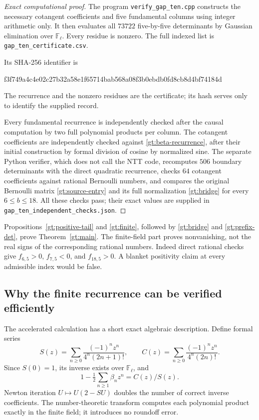 \begin{proof}[Exact computational proof]
The program \texttt{verify\_gap\_ten.cpp} constructs the necessary
cotangent coefficients and five fundamental columns using integer
arithmetic only. It then evaluates all $73722$ five-by-five
determinants by Gaussian elimination over $\mathbb F_\ell$.
Every residue is nonzero. The full indexed list is
\texttt{gap\_ten\_certificate.csv}.
\begin{samepage}
\noindent Its SHA-256 identifier is
\begin{center}\small\ttfamily
f3f749a4c4e02c27b32a58e1f65714bab568a08f3b0ebdb0fd8cb8d4bf74184d
\end{center}
\end{samepage}
The recurrence and the nonzero residues are the certificate; its
hash serves only to identify the supplied record.

Every fundamental recurrence is independently checked after the
causal computation by two full polynomial products per column.
The cotangent coefficients are independently checked against
\eqref{gt:beta-recurrence}, after their initial construction by
formal division of cosine by normalized sine.
The separate Python verifier, which does not call the NTT code,
recomputes $506$ boundary determinants with the direct quadratic
recurrence, checks $64$ cotangent coefficients against rational
Bernoulli numbers, and compares the original Bernoulli matrix
\eqref{gt:source-entry} and its full normalization
\eqref{gt:bridge} for every $6\le b\le18$.
All these checks pass; their exact values are supplied in
\texttt{gap\_ten\_independent\_checks.json}.
\end{proof}

Propositions~\ref{gt:positive-tail} and \ref{gt:finite}, followed
by \eqref{gt:bridge} and \eqref{gt:prefix-det}, prove
Theorem~\ref{gt:main}. The finite-field part proves nonvanishing,
not the real signs of the corresponding rational numbers.
Indeed direct rational checks give $f_{6,5}>0$, $f_{7,5}<0$,
and $f_{18,5}>0$. A blanket positivity claim at every admissible
index would be false.

\subsection{Why the finite recurrence can be verified efficiently}
\label{gt:fast}

The accelerated calculation has a short exact algebraic description.
Define formal series
\[
 S(z)=\sum_{n\ge0}\frac{(-1)^n z^n}{4^n(2n+1)!},\qquad
 C(z)=\sum_{n\ge0}\frac{(-1)^n z^n}{4^n(2n)!}.
\]
Since $S(0)=1$, its inverse exists over $\mathbb F_\ell$, and
\[
             1-\tfrac12\sum_{n\ge1}\beta_nz^n=C(z)/S(z).
\]
Newton iteration $U\mapsto U(2-SU)$ doubles the number of correct
inverse coefficients. The number-theoretic transform computes each
polynomial product exactly in the finite field; it introduces no
roundoff error.

